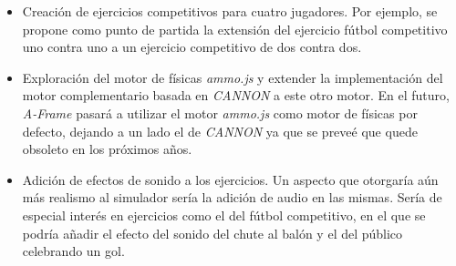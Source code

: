 \begin{itemize}
    \item Creación de ejercicios competitivos para cuatro jugadores. Por ejemplo, se propone como punto de partida la extensión del ejercicio fútbol competitivo uno contra uno a un ejercicio competitivo de dos contra dos.
    \item Exploración del motor de físicas \textit{ammo.js} y extender la implementación del motor complementario basada en \textit{CANNON} a este otro motor. En el futuro, \textit{A-Frame} pasará a utilizar el motor \textit{ammo.js} como motor de físicas por defecto, dejando a un lado el de \textit{CANNON} ya que se preveé que quede obsoleto en los próximos años.
    \item Adición de efectos de sonido a los ejercicios. Un aspecto que otorgaría aún más realismo al simulador sería la adición de audio en las mismas. Sería de especial interés en ejercicios como el del fútbol competitivo, en el que se podría añadir el efecto del sonido del chute al balón y el del público celebrando un gol.
\end{itemize}
